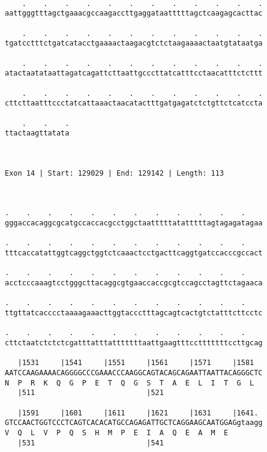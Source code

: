 \documentclass{article}
\begin{document}
\begin{Verbatim}
  
    .    .    .    .    .    .    .    .    .    .    .    .
aattgggtttagctgaaacgccaagaccttgaggataatttttagctcaagagcacttac
                                                            
    .    .    .    .    .    .    .    .    .    .    .    .
tgatcctttctgatcatacctgaaaactaagacgtctctaagaaaactaatgtataatga
                                                            
    .    .    .    .    .    .    .    .    .    .    .    .
atactaatataattagatcagattcttaattgcccttatcatttcctaacatttctcttt
                                                            
    .    .    .    .    .    .    .    .    .    .    .    .
cttcttaatttccctatcattaaactaacatactttgatgagatctctgttctcatccta
                                                            
    .    .    .
ttactaagttatata
               
               
 
Exon 14 | Start: 129029 | End: 129142 | Length: 113



.    .    .    .    .    .    .    .    .    .    .    .    
gggaccacaggcgcatgccaccacgcctggctaatttttatatttttagtagagatagaa
                                                            
.    .    .    .    .    .    .    .    .    .    .    .    
tttcaccatattggtcaggctggtctcaaactcctgacttcaggtgatccacccgccact
                                                            
.    .    .    .    .    .    .    .    .    .    .    .    
acctcccaaagtcctgggcttacaggcgtgaaccaccgcgtccagcctagttctagaaca
                                                            
.    .    .    .    .    .    .    .    .    .    .    .    
ttgttatcacccctaaaagaaacttggtaccctttagcagtcactgtctatttcttcctc
                                                            
.    .    .    .    .    .    .    .    .    .    .    .    
cttctaatctctctcgatttatttatttttttaattgaagtttcctttttttccttgcag
                                                            
   |1531     |1541     |1551     |1561     |1571     |1581  
AATCCAAGAAAACAGGGGCCCGAAACCCAAGGCAGTACAGCAGAATTAATTACAGGGCTC
N  P  R  K  Q  G  P  E  T  Q  G  S  T  A  E  L  I  T  G  L  
   |511                          |521                       
  
   |1591     |1601     |1611     |1621     |1631     |1641. 
GTCCAACTGGTCCCTCAGTCACACATGCCAGAGATTGCTCAGGAAGCAATGGAGgtaagg
V  Q  L  V  P  Q  S  H  M  P  E  I  A  Q  E  A  M  E        
   |531                          |541                       
  

\end{Verbatim}
\end{document}
